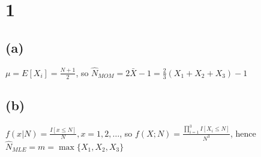 \def\thecourse{18.466}
\def\thestudent{Zhilei Xu (929552018)}
\def\theprob{Midterm 2}

\usepackage{titlesec, pgfplots, subcaption}
\titleformat{\section}[runin]{\Large\bfseries}{}{}{}
\titleformat{\subsection}[runin]{\normalfont\large\bfseries}{}{}{}

\section*{1}
\subsection*{(a)}
$
\mu= E[X_i] = \frac{N+1}{2}
$,
so
$
\hat{N}_{MOM} =
2\bar{X}-1 = \frac{2}{3}(X_1+X_2+X_3)-1
$

\subsection*{(b)}
$
f(x | N) = \frac{I[x \leq N]}{N}, x=1,2,\dots
$,
so
$
f(X; N) = 
\frac{\prod_{i=1}^{3}I[X_i \leq N]}{N^3}
$,
hence
$
\hat{N}_{MLE} =
m = \max\{X_1, X_2, X_3\}
$

